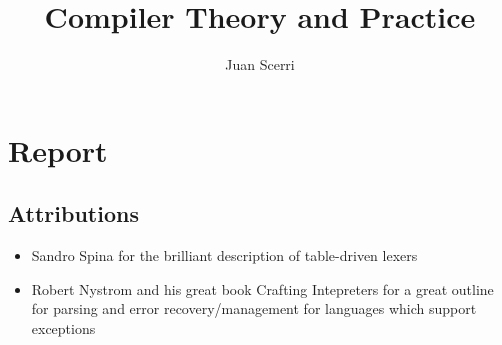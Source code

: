 \documentclass[article]{uom-coursework}
\title{Compiler Theory and Practice}
\author{Juan Scerri}
\begin{document}

\pagestyle{umpage}

\frontmatter

\maketitle %

\tableofcontents %

\clearpage

\lstlistoflistings

\clearpage

\mainmatter

\chapter*{Report}
\label{chap:report}





\section{Attributions}

\begin{itemize}
    \item Sandro Spina for the brilliant description of table-driven lexers
    \item Robert Nystrom and his great book Crafting Intepreters for a great
        outline for parsing and error recovery/management for languages
        which support exceptions
\end{itemize}
\end{document}
